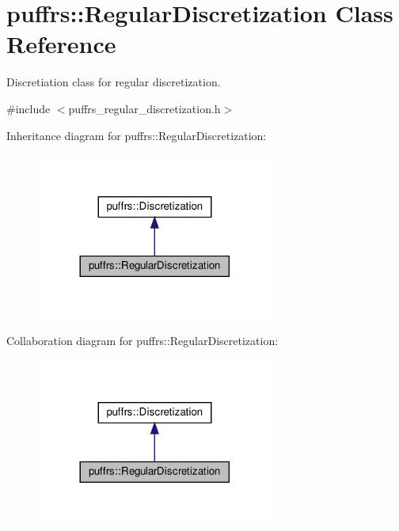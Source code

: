 \hypertarget{classpuffrs_1_1RegularDiscretization}{}\section{puffrs\+:\+:Regular\+Discretization Class Reference}
\label{classpuffrs_1_1RegularDiscretization}


Discretiation class for regular discretization.  




{\ttfamily \#include $<$puffrs\+\_\+regular\+\_\+discretization.\+h$>$}



Inheritance diagram for puffrs\+:\+:Regular\+Discretization\+:\nopagebreak
\begin{figure}[H]
\begin{center}
\leavevmode
\includegraphics[width=221pt]{classpuffrs_1_1RegularDiscretization__inherit__graph}
\end{center}
\end{figure}


Collaboration diagram for puffrs\+:\+:Regular\+Discretization\+:\nopagebreak
\begin{figure}[H]
\begin{center}
\leavevmode
\includegraphics[width=221pt]{classpuffrs_1_1RegularDiscretization__coll__graph}
\end{center}
\end{figure}
